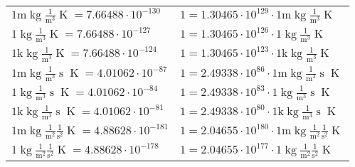 \begin{center}
\begin{longtable}{l l}
{\color{gray}$1 \bm{\mathrm{ m}}\operatorname{kg}\frac1{\operatorname{m}^3}{}{}{\operatorname{K}} = 7.66488\cdot10^{-130} $}   & {\color{gray}$ 1 = 1.30465\cdot10^{129} \cdot 1 \bm{\mathrm{ m}}\operatorname{kg}\frac1{\operatorname{m}^3}{}{}{\operatorname{K}}$}  \\
{\color{black}$1 \bm{\mathrm{ }}\operatorname{kg}\frac1{\operatorname{m}^3}{}{}{\operatorname{K}} = 7.66488\cdot10^{-127} $}   & {\color{black}$ 1 = 1.30465\cdot10^{126} \cdot 1 \bm{\mathrm{ }}\operatorname{kg}\frac1{\operatorname{m}^3}{}{}{\operatorname{K}}$}  \\
{\color{gray}$1 \bm{\mathrm{ k}}\operatorname{kg}\frac1{\operatorname{m}^3}{}{}{\operatorname{K}} = 7.66488\cdot10^{-124} $}   & {\color{gray}$ 1 = 1.30465\cdot10^{123} \cdot 1 \bm{\mathrm{ k}}\operatorname{kg}\frac1{\operatorname{m}^3}{}{}{\operatorname{K}}$}  \\
{\color{gray}$1 \bm{\mathrm{ m}}\operatorname{kg}\frac1{\operatorname{m}^3}{\operatorname{s}}{}{\operatorname{K}} = 4.01062\cdot10^{-87} $}   & {\color{gray}$ 1 = 2.49338\cdot10^{86} \cdot 1 \bm{\mathrm{ m}}\operatorname{kg}\frac1{\operatorname{m}^3}{\operatorname{s}}{}{\operatorname{K}}$}  \\
{\color{black}$1 \bm{\mathrm{ }}\operatorname{kg}\frac1{\operatorname{m}^3}{\operatorname{s}}{}{\operatorname{K}} = 4.01062\cdot10^{-84} $}   & {\color{black}$ 1 = 2.49338\cdot10^{83} \cdot 1 \bm{\mathrm{ }}\operatorname{kg}\frac1{\operatorname{m}^3}{\operatorname{s}}{}{\operatorname{K}}$}  \\
{\color{gray}$1 \bm{\mathrm{ k}}\operatorname{kg}\frac1{\operatorname{m}^3}{\operatorname{s}}{}{\operatorname{K}} = 4.01062\cdot10^{-81} $}   & {\color{gray}$ 1 = 2.49338\cdot10^{80} \cdot 1 \bm{\mathrm{ k}}\operatorname{kg}\frac1{\operatorname{m}^3}{\operatorname{s}}{}{\operatorname{K}}$}  \\
{\color{gray}$1 \bm{\mathrm{ m}}\operatorname{kg}\frac1{\operatorname{m}^2}\frac1{\operatorname{s}^2}{}{\operatorname{K}} = 4.88628\cdot10^{-181} $}   & {\color{gray}$ 1 = 2.04655\cdot10^{180} \cdot 1 \bm{\mathrm{ m}}\operatorname{kg}\frac1{\operatorname{m}^2}\frac1{\operatorname{s}^2}{}{\operatorname{K}}$}  \\
{\color{black}$1 \bm{\mathrm{ }}\operatorname{kg}\frac1{\operatorname{m}^2}\frac1{\operatorname{s}^2}{}{\operatorname{K}} = 4.88628\cdot10^{-178} $}   & {\color{black}$ 1 = 2.04655\cdot10^{177} \cdot 1 \bm{\mathrm{ }}\operatorname{kg}\frac1{\operatorname{m}^2}\frac1{\operatorname{s}^2}{}{\operatorname{K}}$}  \\

\end{longtable}
\end{center}
